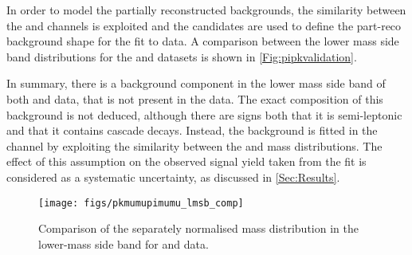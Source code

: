 In order to model the partially reconstructed backgrounds, the similarity between the \Lbpi and \LbK channels is exploited and the \LbK candidates are used to define the part-reco background shape for the fit to \Lbpi data. A comparison between the lower mass side band distributions for the \Lbpi and \LbK datasets is shown in \autoref{Fig:pipkvalidation}.

In summary, there is a background component in the lower mass side band of both \LbK and \Lbpi data, that is not present in the \Lbpijpsi data. The exact composition of this background is not deduced, although there are signs both that it is semi-leptonic and that it contains \Lc cascade decays. Instead, the background is fitted in the \Lbpi channel by exploiting the similarity between the \Lbpi and \LbK mass distributions. The effect of this assumption on the observed signal yield taken from the fit is considered as a systematic uncertainty, as discussed in \autoref{Sec:Results}.

\begin{figure}[!h]\def\nh{0.3\textwidth}
  
  \centering
  
  \texttt{[image: figs/pkmumupimumu\_lmsb\_comp]}

  \caption{Comparison of the separately normalised \Lb mass distribution in the lower-mass side band for \LbK and \Lbpi data.}
\label{Fig:pipkvalidation}
\end{figure}
\FloatBarrier



\clearpage




 
